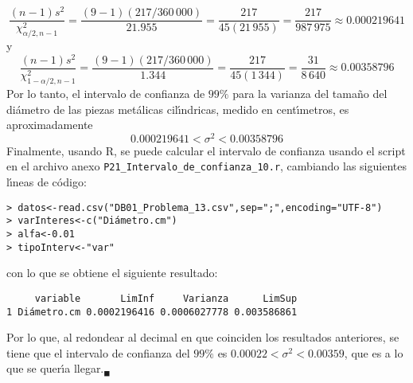 \begin{solucion}
 \begin{equation*}
  \frac{(n-1)s^2}{\chi^2_{\alpha/2,n-1}} = \frac{(9-1)(217/360\,000)}{21.955} = \frac{217}{45(21\,955)} = \frac{217}{987\,975} \approx 0.000219641
 \end{equation*}
 y
 \begin{equation*}
  \frac{(n-1)s^2}{\chi^2_{1-\alpha/2,n-1}} = \frac{(9-1)(217/360\,000)}{1.344} = \frac{217}{45(1\,344)} = \frac{31}{8\,640} \approx 0.00358796
 \end{equation*}
 Por lo tanto, el intervalo de confianza de $99\%$ para la varianza del tama\~no del di\'ametro de las piezas met\'alicas cil\'{\i}ndricas, medido en cent\'{\i}metros, es aproximadamente
 \begin{equation*}
  0.000219641 < \sigma^2 < 0.00358796
 \end{equation*}
 Finalmente, usando R, se puede calcular el intervalo de confianza usando el script en el archivo anexo \texttt{P21\_Intervalo\_de\_confianza\_10.r}, cambiando las siguientes l\'{\i}neas de c\'odigo:
 \begin{verbatim}
> datos<-read.csv("DB01_Problema_13.csv",sep=";",encoding="UTF-8")
> varInteres<-c("Diámetro.cm")
> alfa<-0.01
> tipoInterv<-"var"
 \end{verbatim}
 \vspace{-0.5cm}
 con lo que se obtiene el siguiente resultado:
 \begin{verbatim}
     variable       LimInf     Varianza      LimSup
1 Diámetro.cm 0.0002196416 0.0006027778 0.003586861
 \end{verbatim}
 \vspace{-0.5cm}
 Por lo que, al redondear al decimal en que coinciden los resultados anteriores, se tiene que el intervalo de confianza del $99\%$ es $0.00022 < \sigma^2 < 0.00359$, que es a lo que se quer\'{\i}a llegar.${}_{\blacksquare}$
\end{solucion}
